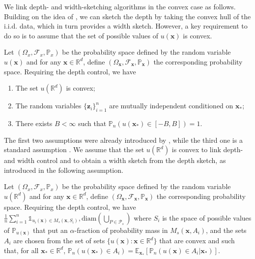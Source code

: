 We link depth- and width-sketching algorithms in the convex case as follows. Building on the idea of \cite{angelopoulos2024conformal}, we can sketch the depth by taking the convex hull of the i.i.d. data,
which in turn provides a width sketch. However, a key requirement to do so is to assume that the set of possible values of $u(\bm{x})$ is convex.

\begin{assumption}
  Let $(\Omega_x,\mathcal{F}_x,\mathbb{P}_x)$ be the probability space defined by the random variable $u(\bm{x})$ and  for any $\bm{x} \in \mathbb{R}^d$, define $(\Omega_{\bm{x}},\mathcal{F}_{\bm{x}},\mathbb{P}_{\bm{x}})$ the corresponding probability space. Requiring the depth control, we have 
  \begin{enumerate}[label=(\Alph*),labelindent=0pt,itemsep=0pt,topsep=0pt]
    \item \label{ass:convex} The set $u(\mathbb{R}^d)$ is convex;
    \item \label{ass:iid} The random variables $\{ \bm{z}_i \}_{i=1}^n$  are mutually independent conditioned on $\bm{x}_*$;
    \item \label{ass:bounded} There exists $B < \infty$ such that  $\mathbb{P}_n(u(\bm{x}_*) \in [-B,B]) =1$.
\end{enumerate}
\end{assumption}

The first two assumptions were already introduced by \citet{angelopoulos2024conformal}, while the third one is a standard assumption \citep[e.g., see][]{lei2018distributionfree,bates2021distributionfree}.
We assume that the set $u(\mathbb{R}^d)$ is convex to link depth- and width control and to obtain a width sketch from the depth sketch, as introduced in the following assumption.

\begin{assumption}[Convexity] \label{ass:convex}
  Let $(\Omega_x,\mathcal{F}_x,\mathbb{P}_x)$ be the probability space defined by the random variable $u(\mathbb{R}^d)$ and  for any $\bm{x} \in \mathbb{R}^d$, define $(\Omega_{\bm{x}},\mathcal{F}_{\bm{x}},\mathbb{P}_{\bm{x}})$ the corresponding probability space. Requiring the depth control, we have \label{ass:convex1} $\frac{1}{n} \sum_{i=1}^n \mathds{1}_{u_i(\bm{x}) \in M_{s}(\bm{x},S_i)},\mathrm{diam}(\bigcup_{P \in  \mathcal{P}_s})$ where $S_i$ is the space of possible values of $\mathbb{P}_{u(\bm{x})}$ that put an $\alpha$-fraction of probability mass in $M_{s}(\bm{x},A_i)$, and the sets $A_i$ are chosen from the set of sets 
$\{u(\bm{x}) : \bm{x} \in \mathbb{R}^d\}$ that are convex and such that, for all $\bm{x}_*\in \mathbb{R}^d$, $\mathbb{P}_n(u(\bm{x}_*) \in A_i) = \mathbb{E}_{\bm{x}_*}[ \mathbb{P}_n(u(\bm{x}) \in A_i |\bm{x}_*)].$
\end{assumption}

